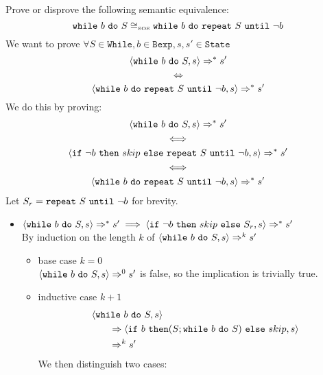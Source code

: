 \begin{exercise}{
    Prove or disprove the following semantic equivalence:
    \[ \texttt{while}\ b\ \texttt{do}\ S \cong_{\text{\tiny SOS}} \texttt{while}\ b\ \texttt{do}\ \texttt{repeat}\ S\ \texttt{until}\ \neg b  \]\vspace*{-0.6cm}
}
    We want to prove $\forall S \in \texttt{While}, b \in \texttt{Bexp}, s, s' \in \texttt{State}$
    \[ \left<\texttt{while}\ b\ \texttt{do}\ S, s\right> \Rightarrow^* s' \]\vspace*{-0.9cm}
    \[ \iff \]\vspace*{-0.7cm}
    \[ \left<\texttt{while}\ b\ \texttt{do}\ \texttt{repeat}\ S\ \texttt{until}\ \neg b, s\right> \Rightarrow^* s' \]
    We do this by proving:
    \begin{gather*}
        \instr{\wwhile{b}{S}}{s} \Rightarrow^* s' \\
        \iff \\
        \instr{\texttt{if}\ \neg b\ \texttt{then}\ skip\ \texttt{else}\ \wrepeat{S}{\neg b}}{s} \Rightarrow^* s' \\
        \iff \\
        \instr{\wwhile{b}{\wrepeat{S}{\neg b}}}{s} \Rightarrow^* s'
    \end{gather*}
    Let $S_r = \texttt{repeat}\ S\ \texttt{until}\ \neg b$ for brevity.
    \begin{itemize}
        \item $\instr{\wwhile{b}{S}}{s} \Rightarrow^* s' \implies \instr{\texttt{if}\ \neg b\ \texttt{then}\ skip\ \texttt{else}\ S_r}{s} \Rightarrow^* s'$ \\
            By induction on the length $k$ of $\left<\texttt{while}\ b\ \texttt{do}\ S, s\right> \Rightarrow^k s'$
            \begin{itemize}
                \item base case $k=0$ \\
                $\left<\texttt{while}\ b\ \texttt{do}\ S, s\right> \Rightarrow^0 s'$ is false, so the implication is trivially true.
                \item inductive case $k+1$ \vspace*{-0.3cm}
                \begin{align*}
                    &\instr{\wwhile{b}{S}}{s}
                    \\&\qquad\Rightarrow \instr{\texttt{if}\ b\ \texttt{then} (S; \wwhile{b}{S})\ \texttt{else}\ skip}{s}
                    \\&\qquad\Rightarrow^k s'
                \end{align*}
                We then distinguish two cases:
                \begin{itemize}

\end{itemize}
\end{itemize}
\end{itemize}
\end{exercise}
